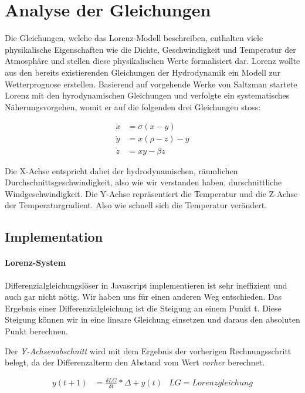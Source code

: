 \documentclass[implementation]{subfiles}
\begin{document}
	\section{Analyse der Gleichungen}
	Die Gleichungen, welche das Lorenz-Modell beschreiben, enthalten viele physikalische Eigenschaften wie die Dichte, Geschwindigkeit und Temperatur der Atmosphäre und stellen diese physikalischen Werte formalisiert dar. Lorenz wollte aus den bereits existierenden Gleichungen der Hydrodynamik ein Modell zur Wetterprognose erstellen. Basierend auf vorgehende Werke von Saltzman startete Lorenz mit den hyrodynamischen Gleichungen und verfolgte ein systematisches Näherungsvorgehen, womit er auf die folgenden drei Gleichungen stoss:
		
		\begin{centerFigure}
			\begin{align}
			\dot{x} &= \sigma(x - y)\\
			\dot{y} &= x(\rho - z) - y\\
			\dot{z} &= xy - \beta z
			\end{align}
		\end{centerFigure}
		
	Die X-Achse entspricht dabei der hydrodynamischen, räumlichen Durchschnittsgeschwindigkeit, also wie wir verstanden haben, durschnittliche Windgeschwindigkeit. 
	Die Y-Achse repräsentiert die Temperatur und die Z-Achse der Temperaturgradient. Also wie schnell sich die Temperatur verändert. 
	
	\subsection{Implementation}
	
	\paragraph{Lorenz-System}
	Differenzialgleichungslöser in Javascript implementieren ist sehr ineffizient und auch gar nicht nötig. Wir haben uns für einen anderen Weg entschieden. Das Ergebnis einer Differenzialgleichung ist die Steigung an einem Punkt t. Diese Steigung können wir in eine lineare Gleichung einsetzen und daraus den absoluten Punkt berechnen.
	
	Der \textit{Y-Achsenabschnitt} wird mit dem Ergebnis der vorherigen Rechnungsschritt belegt, da der Differenzalterm den Abstand vom Wert \textit{vorher} berechnet.  
	
	\begin{align}
		\label{LGResult}
		y(t + 1) &= \frac{\delta LG}{\delta t} * \Delta + y(t) & LG = Lorenzgleichung
	\end{align}
	
\end{document}
